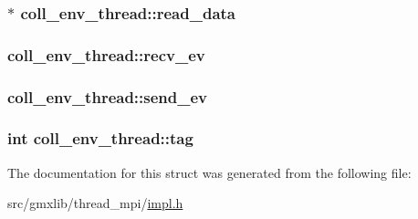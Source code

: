 \hypertarget{structcoll__env__thread_afc78bfefafe93d86da6cf2d2c1ff181f}{
\subsubsection[{read\-\_\-data}]{$\ast$ {\bf coll\-\_\-env\-\_\-thread\-::read\-\_\-data}}}\label{structcoll__env__thread_afc78bfefafe93d86da6cf2d2c1ff181f}
\hypertarget{structcoll__env__thread_a68b2b5cd356dfe818bd696d6388edb04}{
\subsubsection[{recv\-\_\-ev}]{ {\bf coll\-\_\-env\-\_\-thread\-::recv\-\_\-ev}}}\label{structcoll__env__thread_a68b2b5cd356dfe818bd696d6388edb04}
\hypertarget{structcoll__env__thread_ac1e8a760c653e74784855f99c4966b9a}{
\subsubsection[{send\-\_\-ev}]{ {\bf coll\-\_\-env\-\_\-thread\-::send\-\_\-ev}}}\label{structcoll__env__thread_ac1e8a760c653e74784855f99c4966b9a}
\hypertarget{structcoll__env__thread_a4eec1094304c416a746b0f7d7093c140}{
\subsubsection[{tag}]{\setlength{\rightskip}{0pt plus 5cm}int {\bf coll\-\_\-env\-\_\-thread\-::tag}}}\label{structcoll__env__thread_a4eec1094304c416a746b0f7d7093c140}


\-The documentation for this struct was generated from the following file\-:\begin{DoxyCompactItemize}
\item 
src/gmxlib/thread\-\_\-mpi/\hyperlink{impl_8h}{impl.\-h}\end{DoxyCompactItemize}
